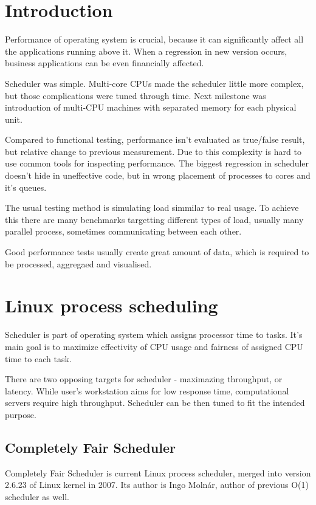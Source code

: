 \chapter{Introduction}
Performance of operating system is crucial, because it can significantly affect all the applications running above it.
When a regression in new version occurs, business applications can be even financially affected.

Scheduler was simple. Multi-core CPUs made the scheduler little more complex, but those complications were tuned through time.
Next milestone was introduction of multi-CPU machines with separated memory for each physical unit.

Compared to functional testing, performance isn't evaluated as true/false result, but relative change to previous measurement.
Due to this complexity is hard to use common tools for inspecting performance.
The biggest regression in scheduler doesn't hide in uneffective code, but in wrong placement of processes to cores and it's queues.

The usual testing method is simulating load simmilar to real usage.
To achieve this there are many benchmarks targetting different types of load, usually many parallel process, sometimes communicating between each other.

Good performance tests usually create great amount of data, which is required to be processed, aggregaed and visualised.

\chapter{Linux process scheduling}
Scheduler is part of operating system which assigns processor time to tasks.
It's main goal is to maximize effectivity of CPU usage and fairness of assigned
CPU time to each task.

There are two opposing targets for scheduler - maximazing throughput, or
latency. While user's workstation aims for low response time, computational
servers require high throughput. Scheduler can be then tuned to fit the intended
purpose.

\section{Completely Fair Scheduler}
Completely Fair Scheduler is current Linux process scheduler, merged into version
2.6.23 of Linux kernel in 2007. Its author is Ingo Molnár, author of previous
O(1) scheduler as well.

